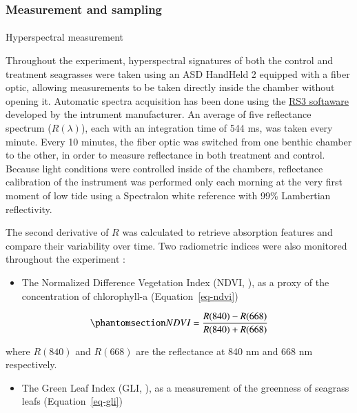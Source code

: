 \documentclass[
  number]{elsarticle}
\makeatletter
\let\oldparagraph\paragraph
\renewcommand{\paragraph}{
    \@ifstar
      \xxxParagraphStar
      \xxxParagraphNoStar
  }
\newcommand{\xxxParagraphStar}[1]{\oldparagraph*{#1}\mbox{}}
\newcommand{\xxxParagraphNoStar}[1]{\oldparagraph{#1}\mbox{}}
\providecommand{\tightlist}{%
  \setlength{\itemsep}{0pt}\setlength{\parskip}{0pt}}\usepackage{longtable,booktabs,array}
\makeatother
\begin{document}
\subsubsection{Measurement and sampling}\label{measurement-and-sampling}

\paragraph{Hyperspectral measurement}\label{hyperspectral-measurement}

Throughout the experiment, hyperspectral signatures of both the control
and treatment seagrasses were taken using an ASD HandHeld 2 equipped
with a fiber optic, allowing measurements to be taken directly inside
the chamber without opening it. Automatic spectra acquisition has been
done using the
\href{https://www.malvernpanalytical.com/en/learn/knowledge-center/user-manuals/rs3-software-user-manual}{RS3
softaware} developed by the intrument manufacturer. An average of five
reflectance spectrum (\(R(\lambda)\)), each with an integration time of
544 ms, was taken every minute. Every 10 minutes, the fiber optic was
switched from one benthic chamber to the other, in order to measure
reflectance in both treatment and control. Because light conditions were
controlled inside of the chambers, reflectance calibration of the
instrument was performed only each morning at the very first moment of
low tide using a Spectralon white reference with 99\% Lambertian
reflectivity.

The second derivative of \(R\) was calculated to retrieve absorption
features and compare their variability over time. Two radiometric
indices were also monitored throughout the experiment :

\begin{itemize}
\tightlist
\item
  The Normalized Difference Vegetation Index (NDVI,
  \citep{rouse1974monitoring}), as a proxy of the concentration of
  chlorophyll-a (Equation~\ref{eq-ndvi})
\end{itemize}

\begin{equation}\phantomsection\label{eq-ndvi}{
NDVI = \frac{R(840)-R(668)}{R(840)+R(668)}
}\end{equation}

where \(R(840)\) and \(R(668)\) are the reflectance at 840 nm and 668 nm
respectively.

\begin{itemize}
\tightlist
\item
  The Green Leaf Index (GLI, \citep{louhaichi2001spatially}), as a
  measurement of the greenness of seagrass leafs (Equation~\ref{eq-gli})
\end{itemize}
\end{document}
